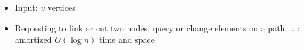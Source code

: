 \begin{itemize}
	\item Input: $v$ vertices
	\item Requesting to link or cut two nodes, query or change elements on a path, ...: amortized $O(\log{n})$ time and space
\end{itemize}
